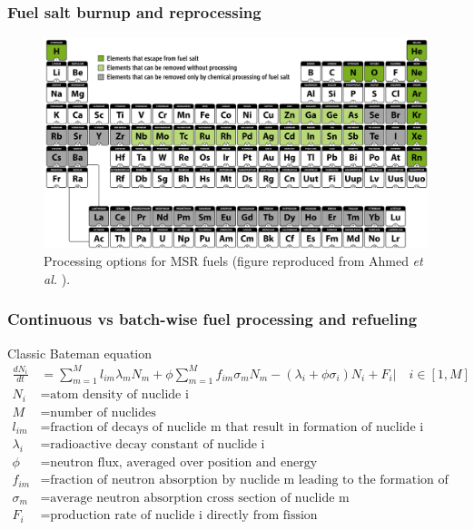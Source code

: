 \begin{frame}
\frametitle{Fuel salt burnup and reprocessing}
		\vspace{-5mm}
	\begin{figure}[t]
		\hspace*{-0.2in}
			\includegraphics[height=0.6\textwidth]{./images/periodic_map.png}
		\vspace{-0.15in}
		\caption{Processing options for MSR fuels (figure reproduced from Ahmed \emph{et al.}  \cite{ahmad_neutronics_2015}).}
	\end{figure}               
\end{frame}


\begin{frame}
\frametitle{Continuous vs batch-wise fuel processing  and refueling}
\vspace{-8mm}
\begin{block}{Classic Bateman equation}
	\begin{align}
	\frac{dN_i}{dt} &= \sum_{m=1}^{M}l_{im}\lambda_mN_m + 
	\phi\sum_{m=1}^{M}f_{im}\sigma_mN_m - (\lambda_i + \phi\sigma_i)N_i + 
	F_i\Big|\quad{i\in [1,M]} \nonumber\\
	N_i &= \mbox{atom density of nuclide i} \nonumber \\
	M &= \mbox{number of nuclides} \nonumber \\
	l_{im} &= \mbox{fraction of decays of nuclide m that result in formation 
	of 
		nuclide i}\nonumber \\
	\lambda_i &= \mbox{radioactive decay constant of nuclide i} \nonumber \\
	\phi &= \mbox{neutron flux, averaged over position and energy} \nonumber \\
	f_{im} &= \mbox{fraction of neutron absorption by nuclide m leading to the 
		formation of nuclide i} \nonumber \\
	\sigma_m &= \mbox{average neutron absorption cross section of nuclide m} 
	\nonumber \\
	F_i &= \mbox{production rate of nuclide i directly from fission}\nonumber
	\end{align}
\end{block}
\end{frame}

